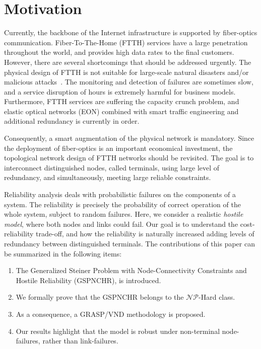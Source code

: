 \documentclass{llncs}
\begin{document}
\section{Motivation}\label{sect:intro}
Currently, the backbone of the Internet infrastructure is supported by fiber-optics communication. Fiber-To-The-Home (FTTH) services have a large penetration throughout the world, and provides high data rates to the final customers. 
However, there are several shortcomings that should be addressed urgently. The physical design of FTTH is not suitable for 
large-scale natural disasters and/or malicious attacks~\cite{116}. The monitoring and detection of failures are sometimes slow, and a service disruption of hours is extremely harmful for business models. Furthermore, FTTH services are suffering the capacity crunch problem, and elastic optical networks (EON) combined with smart traffic engineering and additional redundancy is currently in order.

Consequently, a smart augmentation of the physical network is mandatory. Since the deployment of fiber-optics is an important economical investment, the topological network design of FTTH networks should be revisited. The goal is to interconnect 
distinguished nodes, called terminals, using large level of redundancy, and simultaneously, meeting large reliable constraints.

Reliability analysis deals with probabilistic failures on the components of a system. The reliability is precisely the 
probability of correct operation of the whole system, subject to random failures. Here, we consider a realistic \emph{hostile model}, where both nodes and links could fail. Our goal is to understand the cost-reliability trade-off, and how the reliability is naturally increased adding levels of redundancy between distinguished terminals. 
The contributions of this paper can be summarized in the following items:
\begin{enumerate}
\item The Generalized Steiner Problem with Node-Connectivity Constraints and Hostile Reliability (GSPNCHR), is introduced. 
\item We formally prove that the GSPNCHR belongs to the $\mathcal{NP}$-Hard class. 
\item As a consequence, a GRASP/VND methodology is proposed.
\item Our results highlight that the model is robust under non-terminal node-failures, rather than link-failures.
\end{enumerate}
\end{document}

